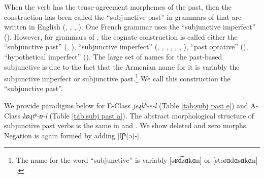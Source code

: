 	When the verb has the tense-agreement morphemes of the past, then the construction has been called the “subjunctive past” in grammars of {\seaSEA} that are written in English (\citealt[174]{BardakjianVaux-1999-easternArmeniantextbook}, \citealt[160]{Hagopian-2007-ArmenianTextbookEveryone}, \citealt[150]{Sakayan-2007-TextbookEasternArmenian}, \citealt[249]{DumTragut-2009-ArmenianReferenceGrammar}). One French grammar uses the “subjunctive imperfect” (\citealt[191]{Minassian-1980-EastArmenianGrammar}). However, for grammars of {\swaSWA}, the cognate construction is called either the “subjunctive past” (\citealt[113]{Sakayan-2000-TextbookWesternArmenian}, \citealt[143]{Hagopian-2007-ArmenianTextbookEveryone}), “subjunctive imperfect” (\citealt[35]{Riggs-1856-GrammarModernArmenianConstantinople}, \citealt[50]{Gulian-1902-ElementaryModernGrammarArmenian}, \citealt[107]{Feydit-1948-manuelWesternArmenian}, \citealt[89]{Kogian-1949-ArmenianWestGrammar}, \citealt[154]{BardakjianThomson-1977-WestArmenianTextbook}, \citealt[47]{Andonian-1999-BeginnerArmenian}, \citealt[181]{BardakjianVaux-2001-WasternArmeniantextbook}), “past optative” (\cites[78]{Fairbanks-1948-PhonologyMorphoWestern}{Fairbanks-1958-SpokenWestArmenian}), “hypothetical imperfect” (\citealt{Boyacioglu-2010-HayPayVerbsArmenianOccidentalWestArmenian}). The large set of names for the past-based subjunctive is due to the fact that the Armenian name for it is variably the subjunctive imperfect or subjunctive past.{\footnote{The {\seaAbbre} name for the word “subjunctive” is variably [əʁd͡zɑkɑn]  or [stoɾɑdɑsɑkɑn] . }}  We call this construction the “subjunctive past”. 
	
	
	
	We provide paradigms below for E-Class \textit{{jeɻkʰ-e-l}} (Table \ref{tab:subj past e}) and A-Class \textit{{kɒɻtʰ-ɒ-l}} (Table \ref{tab:subj past a}). The abstract morphological structure of subjunctive past verbs is the same in {\seaSE} and {\iaIA}. We show deleted and zero morphs. Negation is again formed by adding [{t͡ʃʰ(ə)-}].
	

